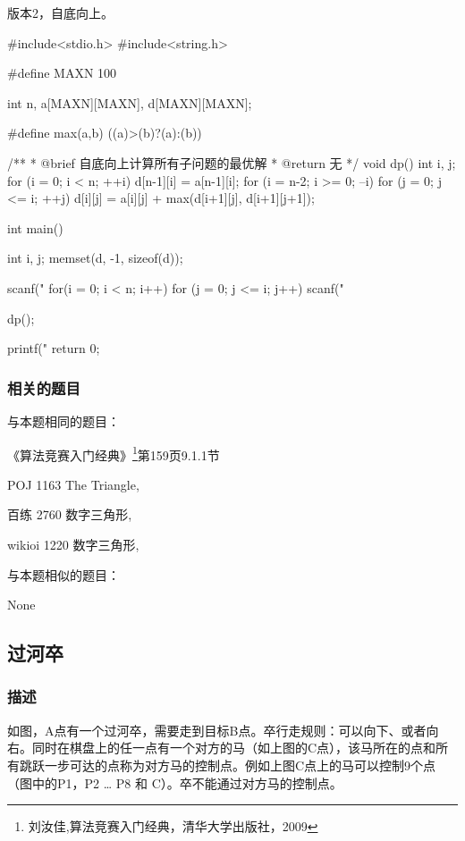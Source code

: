 版本2，自底向上。

\begin{Codex}[label=numbers_triangle2.c]
#include<stdio.h>
#include<string.h>

#define MAXN 100

int n, a[MAXN][MAXN], d[MAXN][MAXN];

#define max(a,b) ((a)>(b)?(a):(b))

/**
 * @brief 自底向上计算所有子问题的最优解
 * @return 无
 */
void dp() {
    int i, j;
    for (i = 0; i < n; ++i) {
        d[n-1][i] = a[n-1][i];
    }
    for (i = n-2; i >= 0; --i)
      for (j = 0; j <= i; ++j)
        d[i][j] = a[i][j] + max(d[i+1][j], d[i+1][j+1]);
}

int main() {
    int i, j;
    memset(d, -1, sizeof(d));

    scanf("%
    for(i = 0; i < n; i++)
      for (j = 0; j <= i; j++) 
          scanf("%

    dp();
    
    printf("%
    return 0;
}
\end{Codex}

\subsubsection{相关的题目}
与本题相同的题目：
\begindot
\item 《算法竞赛入门经典》\footnote{刘汝佳,算法竞赛入门经典，清华大学出版社，2009}第159页9.1.1节
\item POJ 1163 The Triangle, 
\item 百练 2760 数字三角形, 
\item wikioi 1220 数字三角形, 
\myenddot

与本题相似的题目：
\begindot
\item  None
\myenddot


\subsection{过河卒}

\subsubsection{描述}
如图，A点有一个过河卒，需要走到目标B点。卒行走规则：可以向下、或者向右。同时在棋盘上的任一点有一个对方的马（如上图的C点），该马所在的点和所有跳跃一步可达的点称为对方马的控制点。例如上图C点上的马可以控制9个点（图中的P1，P2 … P8 和 C）。卒不能通过对方马的控制点。

